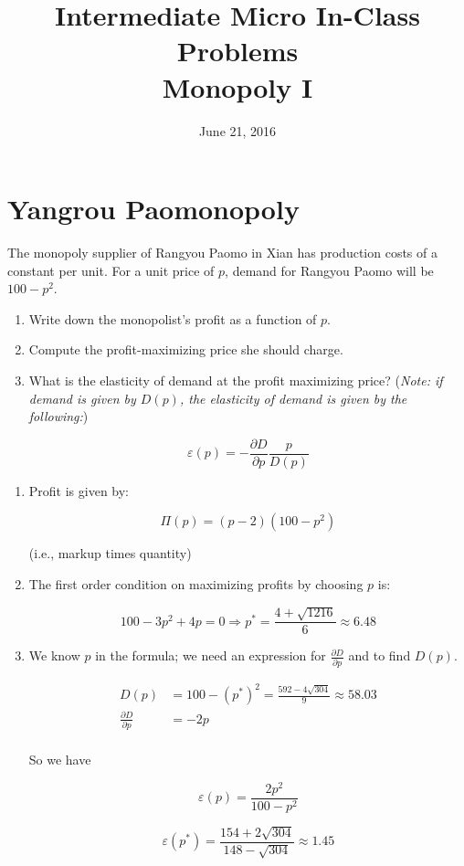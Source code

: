 \documentclass{article}
\newenvironment{solution}{\color{red}}{\color{black}}
\begin{document}
\title{Intermediate Micro In-Class Problems \\ \large Monopoly I}

\date{June 21, 2016}

\maketitle

\section*{Yangrou Paomonopoly}
The monopoly supplier of Rangyou Paomo in Xian has production costs of a constant  per unit. For a unit price of $p$, demand for Rangyou Paomo will be $100 - p^2$. 
\begin{enumerate}
\item Write down the monopolist's profit as a function of $p$.
\item Compute the profit-maximizing price she should charge.
\item What is the elasticity of demand at the profit maximizing price? (\textit{Note: if demand is given by $D(p)$, the elasticity of demand is given by the following:})

\[ \varepsilon (p) = - \frac{\partial D}{\partial p} \frac{p}{D(p)} \]

\end{enumerate}

\begin{solution}

\begin{enumerate}
\item Profit is given by:

\[ \Pi(p) = (p - 2)\left( 100-p^2 \right) \]

(i.e., markup times quantity)

\item The first order condition on maximizing profits by choosing $p$ is:

\[ 100 - 3p^2 + 4p = 0 \Rightarrow p^{*} = \frac{4 + \sqrt{1216}}{6} \approx 6.48 \]

\item We know $p$ in the formula; we need an expression for $\frac{\partial D}{\partial p}$ and to find $D(p)$.

\begin{align*}
D(p) &= 100 - \left( p^{*} \right)^2 = \frac{592 - 4\sqrt{304}}{9} \approx 58.03 \\
\frac{\partial D}{\partial p} &= -2p \\
\end{align*}

So we have

\[ \varepsilon(p) = \frac{2p^2}{100 - p^2} \]

\[ \varepsilon(p^{*}) = \frac{154 + 2\sqrt{304}}{148 - \sqrt{304}} \approx 1.45 \]
\end{enumerate}

\end{solution}
\end{document}
